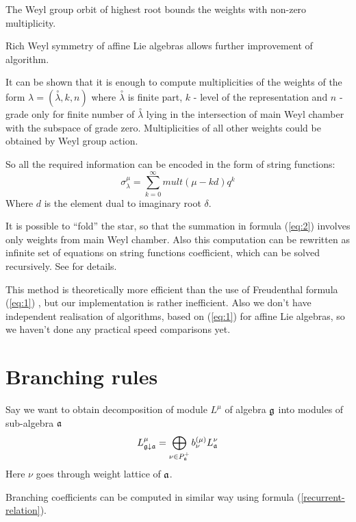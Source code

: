 \documentclass[a4paper,12pt]{article}
\theoremstyle{definition} \newtheorem{Def}{Definition}
\begin{document}
The Weyl group orbit of highest root bounds the weights with non-zero
multiplicity.

Rich Weyl symmetry of affine Lie algebras allows further improvement
of algorithm.

It can be shown that it is enough to compute multiplicities of the
weights of the form $\lambda=(\overset{\circ }{\lambda},k,n)$ where
$\overset{\circ }{\lambda}$ is finite part, $k$ - level of the
representation and $n$ - grade only for finite number of
$\overset{\circ}{\lambda}$ lying in the intersection of main Weyl
chamber with the subspace of grade zero.
Multiplicities of all other weights could be obtained by Weyl group
action. 

So all the required information can be encoded in the form of string functions:
\begin{equation}
  \label{eq:3}
  \sigma^{\mu}_{\lambda}=\sum_{k=0}^{\infty} mult(\mu-kd)q^k
\end{equation}
Where $d$ is the element dual to imaginary root $\delta$. 

It is possible to ``fold'' the star, so that the summation in formula
(\ref{eq:2}) involves only weights from main Weyl chamber. Also this
computation can be rewritten as infinite set of equations on string
functions coefficient, which can be solved recursively. See
\cite{kulish4sfa} for details.

This method is theoretically more efficient than the use of Freudenthal
formula (\ref{eq:1}) \cite{Nazarov2008}, but our implementation is
rather inefficient. Also we don't have independent realisation of algorithms,
based on (\ref{eq:1}) for affine Lie algebras, so we haven't done any
practical speed comparisons yet.
\section{Branching rules}
\label{sec:branching-rules}

Say we want to obtain decomposition of module $L^{\mu}$ of algebra
$\frak{g}$ into modules of sub-algebra $\frak{a}$
\begin{equation}
  \label{eq:4}
  L_{\frak{g}\downarrow \frak{a}}^{\mu }=\bigoplus\limits_{\nu \in P_{\frak{a}%
    }^{+}}b_{\nu }^{\left( \mu \right) }L_{\frak{a}}^{\nu }
\end{equation}
Here $\nu$ goes through weight lattice of $\frak{a}$. 

Branching coefficients can be computed in similar way using formula
(\ref{recurrent-relation}). 
\end{document}
